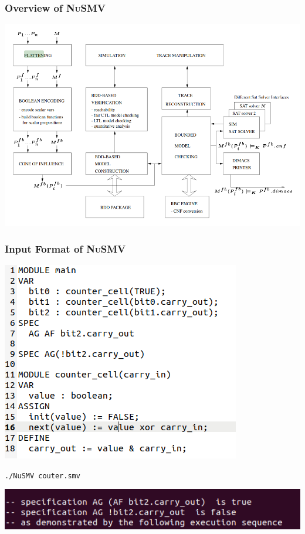 \documentclass[11pt]{beamer}
\begin{document}
\begin{frame}\frametitle{Overview of \textsc{NuSMV}}
\begin{center}
\includegraphics[scale=0.35]{nusmv_overview .png}
\end{center}
\end{frame}

\begin{frame}\frametitle{Input Format of \textsc{NuSMV}}

\begin{center}
\includegraphics[scale=0.4]{nusmv_format.png}
\end{center}
\texttt{./NuSMV couter.smv}



\begin{center}
\includegraphics[scale=0.4]{nusmv_run.png}

\end{center}


\end{frame}
\end{document}
